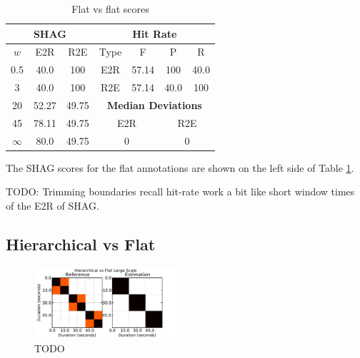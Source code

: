 \documentclass{article}
\begin{document}
\begin{table}
 \begin{center}
   \begin{tabular}{|c|c|c||c|c|c|c|}
  \hline
  \multicolumn{3}{|c||}{\textbf{SHAG}} & \multicolumn{4}{c|}{\textbf{Hit Rate}} \\
  \hline
  $w$ & E2R    & R2E & Type & F     & P     & R \\
  \hline
  0.5       & 40.0   & 100   & E2R & 57.14  & 100 & 40.0 \\
  3         & 40.0   & 100   & R2E & 57.14  & 40.0 & 100  \\
  \cline{4-7}
  20        & 52.27  & 49.75 & \multicolumn{4}{c|}{\textbf{Median Deviations}}   \\
  \cline{4-7}
  45        & 78.11  & 49.75 & \multicolumn{2}{c|}{E2R} & \multicolumn{2}{c|}{R2E} \\
  \cline{4-7}
  $\infty$  & 80.0   & 49.75 & \multicolumn{2}{c|}{0} & \multicolumn{2}{c|}{0}  \\
  \hline
 \end{tabular}
\end{center}
  \caption{Flat vs flat scores}
  \label{tab:flat-flat}
\end{table}

The SHAG scores for the flat annotations are shown on the left side of Table \ref{tab:flat-flat}.

TODO: Trimming boundaries recall hit-rate work a bit like short window times of the E2R of SHAG.


\subsection{Hierarchical vs Flat}

\begin{figure}
  \centering
  \includegraphics[width=0.47\textwidth]{plots/hier-flatlarge.pdf}
  \caption{TODO}
  \label{fig:hier-flatlarge}
\end{figure}%
\end{document}
